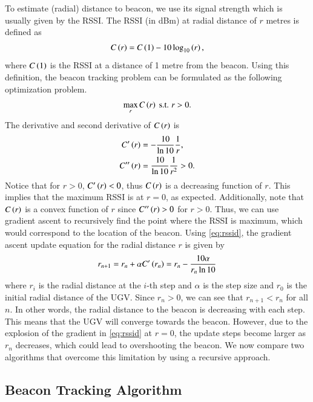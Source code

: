 \documentclass[conference]{IEEEtran}
\begin{document}
To estimate (radial) distance to beacon, we use its signal strength which is
usually given by the RSSI. The RSSI (in dBm) at radial distance of \(r\) metres
is defined as
\begin{align}
    C\left(r\right) = C\left(1\right) - 10\log_{10}\left(r\right),
    \label{eq:rssi}
\end{align}
where \(C\left(1\right)\) is the RSSI at a distance of 1 metre from the beacon. Using
this definition, the beacon tracking problem can be formulated as the following
optimization problem.
\begin{equation}
    \max_{r} C\left(r\right) \text{ s.t. } r > 0.
    \label{eq:rssopt}
\end{equation}
The derivative and second derivative of \(C\left(r\right)\) is
\begin{align}
    C^\prime\left(r\right) &= -\frac{10}{\ln{10}}\frac{1}{r}, \label{eq:rssid} \\
    C^{\prime\prime}\left(r\right) &= \frac{10}{\ln{10}}\frac{1}{r^2} > 0. \label{eq:rssidd}
\end{align}
Notice that for \(r > 0\), \(C^\prime\left(r\right) < 0\), thus \(C\left(r\right)\) is a
decreasing function of \(r\). This implies that the maximum RSSI is at \(r =
0\), as expected. Additionally, note that \(C\left(r\right)\) is a convex function of
\(r\) since \(C^{\prime\prime}\left(r\right) > 0\) for \(r > 0\). Thus, we can use
gradient ascent \cite{boydConvexOptimization2004a} to recursively find the point
where the RSSI is maximum, which would correspond to the location of the beacon.
Using \eqref{eq:rssid}, the gradient ascent update equation for the radial
distance \(r\) is given by
\begin{equation}
    r_{n+1} = r_n + \alpha C^\prime\left(r_n\right) = r_n - \frac{10\alpha}{r_n\ln{10}}
    \label{eq:gradient-ascent-upd}
\end{equation}
where \(r_i\) is the radial distance at the \(i\)-th step and \(\alpha\) is the
step size and \(r_0\) is the initial radial distance of the UGV. Since \(r_n >
0\), we can see that \(r_{n+1} < r_n\) for all \(n\). In other words, the radial
distance to the beacon is decreasing with each step. This means that the UGV
will converge towards the beacon. However, due to the explosion of the gradient
in \eqref{eq:rssid} at \(r = 0\), the update steps become larger as \(r_n\)
decreases, which could lead to overshooting the beacon. We now compare two
algorithms that overcome this limitation by using a recursive approach.

\subsection{Beacon Tracking Algorithm}
\label{subsec:beacon-tracking-algorithm}
\end{document}
